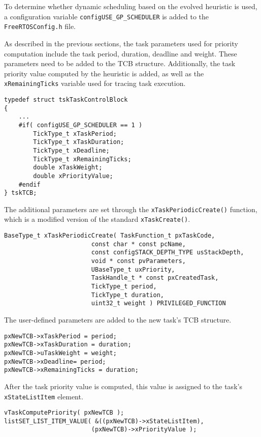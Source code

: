 To determine whether dynamic scheduling based on the evolved heuristic is used, a configuration variable \verb$configUSE_GP_SCHEDULER$ is added to the \verb$FreeRTOSConfig.h$ file. 

As described in the previous sections, the task parameters used for priority computation include the task period, duration, deadline and weight. 
These parameters need to be added to the TCB structure. 
Additionally, the task priority value computed by the heuristic is added, as well as the \verb$xRemainingTicks$ variable used for tracing task execution.
\begin{lstlisting}[frame=none, label={TCB}, caption={Modification of the TCB.}, captionpos=b]
typedef struct tskTaskControlBlock
{
	...
	#if( configUSE_GP_SCHEDULER == 1 )
		TickType_t xTaskPeriod;
		TickType_t xTaskDuration;
		TickType_t xDeadline;
		TickType_t xRemainingTicks;
		double xTaskWeight;
		double xPriorityValue;
	#endif
} tskTCB;
\end{lstlisting}
The additional parameters are set through the \verb$xTaskPeriodicCreate()$ function, which is a modified version of the standard \verb$xTaskCreate()$.
\begin{lstlisting}[frame=none, label={periodicCreate}, caption={The \texttt{xTaskPeriodicCreate()} function prototype.}, captionpos=b]
BaseType_t xTaskPeriodicCreate(	TaskFunction_t pxTaskCode,
						const char * const pcName,		
						const configSTACK_DEPTH_TYPE usStackDepth,
						void * const pvParameters,
						UBaseType_t uxPriority,
						TaskHandle_t * const pxCreatedTask,
						TickType_t period,
						TickType_t duration,
						uint32_t weight ) PRIVILEGED_FUNCTION
\end{lstlisting}
The user-defined parameters are added to the new task's TCB structure. 
\begin{lstlisting}[frame=none, label={TCB_params}, caption={Adding the user-defined task parameters to the TCB structure.}, captionpos=b]
pxNewTCB->xTaskPeriod = period;
pxNewTCB->xTaskDuration = duration;
pxNewTCB->uTaskWeight = weight;
pxNewTCB->xDeadline= period;
pxNewTCB->xRemainingTicks = duration;
\end{lstlisting}
After the task priority value is computed, this value is assigned to the task's \\\verb$xStateListItem$ element. 
\begin{lstlisting}[frame=none, label={init_priority}, caption={Assigning the task priority to the \texttt{xStateListItem} element.}, captionpos=b]
vTaskComputePriority( pxNewTCB );
listSET_LIST_ITEM_VALUE( &((pxNewTCB)->xStateListItem), 
						(pxNewTCB)->xPriorityValue );
\end{lstlisting}
